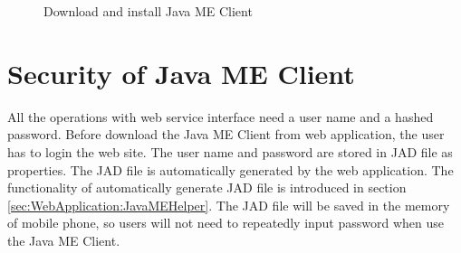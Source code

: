 \begin{figure}[!hbtp]
\centering
{}
\caption{Download and install Java ME Client}
\label{fig:DownloadAndInstallJavaMEClient}
\end{figure}


\section{Security of Java ME Client}
\label{sec:JavaMEClient:SecurityOfJavaMEClient}

All the operations with web service interface need a user name and a hashed password. Before download the Java ME Client from web application, the user has to login the web site. The user name and password are stored in JAD file as properties. The JAD file is automatically generated by the web application. The functionality of automatically generate JAD file is introduced in section \ref{sec:WebApplication:JavaMEHelper}. The JAD file will be saved in the memory of mobile phone, so users will not need to repeatedly input password when use the Java ME Client. 

